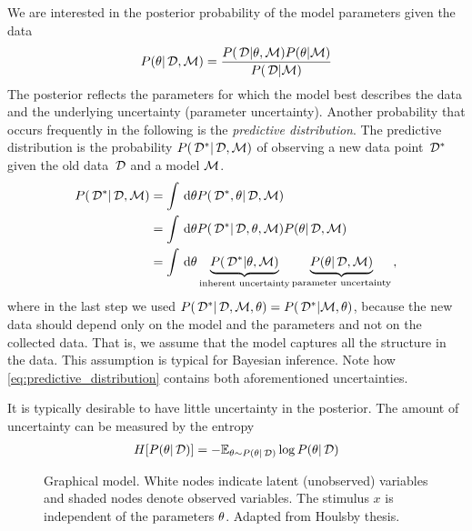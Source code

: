 We are interested in the posterior probability of the model parameters given the data
\begin{align}\label{eq:posterior}
	{P(\theta| \,\mathcal{D}, \mathcal{M})} = \frac{{P(\,\mathcal{D} | \theta, \mathcal{M})} {P(\theta | \mathcal{M})}}{{P(\,\mathcal{D} | \mathcal{M})}}
\end{align}
The posterior reflects the parameters for which the model best describes the data and the underlying uncertainty (parameter uncertainty).
Another probability that occurs frequently in the following is the \emph{predictive distribution}.
The predictive distribution is the probability ${P(\,\mathcal{D}^* | \,\mathcal{D}, \mathcal{M})}$ of observing a new data point $\,\mathcal{D}^*$ given the old data $\,\mathcal{D}$ and a model $\mathcal{M}$.
\begin{align}
	{P(\,\mathcal{D}^* | \,\mathcal{D}, \mathcal{M})}
	&= \int \,\mathrm{d} \theta
		{P(\,\mathcal{D}^*, \theta| \,\mathcal{D}, \mathcal{M})} \\
	&= \int \,\mathrm{d} \theta
		{P(\,\mathcal{D}^* | \,\mathcal{D}, \theta, \mathcal{M})}
		{P(\theta| \,\mathcal{D}, \mathcal{M})} \\
	&= \int \,\mathrm{d} \theta
		\underbrace{
		{P(\,\mathcal{D}^* | \theta, \mathcal{M})}}_{\text{inherent uncertainty}}
		\underbrace{
		{P(\theta | \,\mathcal{D}, \mathcal{M})}}_{\text{parameter uncertainty}} \,, \label{eq:predictive_distribution}
\end{align}
where in the last step we used ${P(\,\mathcal{D}^* | \,\mathcal{D}, \mathcal{M}, \theta)} = {P(\,\mathcal{D}^* | \mathcal{M}, \theta)}$, because the new data should depend only on the model and the parameters and not on the collected data. That is, we assume that the model captures all the structure in the data. This assumption is typical for Bayesian inference. Note how \cref{eq:predictive_distribution} contains both aforementioned uncertainties. 

It is typically desirable to have little uncertainty in the posterior. The amount of uncertainty can be measured by the entropy
\begin{align}
	H[{P(\theta | \,\mathcal{D})}] =
	- \mathbb{E}_{\theta \sim {P(\theta| \,\mathcal{D})}}
	\log {P(\theta| \,\mathcal{D})}
\end{align}

\begin{figure}
\centering
  \caption{Graphical model. White nodes indicate latent (unobserved) variables and shaded nodes denote observed variables. The stimulus $x$ is independent of the parameters $\theta$. Adapted from Houlsby thesis.}\label{fig:graphical_model}
\end{figure}

